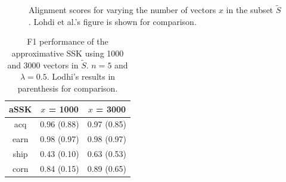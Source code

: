 \begin{figure}
	\centering
	\caption{Alignment scores for varying the number of vectors $ x $ in the subset $ \tilde{S} $. Lohdi et al.'s figure is shown for comparison.\label{fig:alignment}}
\end{figure}

\begin{table}
	\centering
	\begin{tabular}{| c | c | c | }\hline
		aSSK & $ x $ = 1000 & $ x $ = 3000   \\ \hline
		acq & 0.96 (0.88)& 0.97 (0.85)\\ \hline
		earn & 0.98 (0.97) & 0.98  (0.97) \\ \hline
		ship & 0.43 (0.10) & 0.63  (0.53) \\ \hline
		corn & 0.84 (0.15) & 0.89 (0.65) \\ \hline
	\end{tabular} 
	\caption{F1 performance of the approximative SSK using 1000 and 3000 vectors in $ \tilde{S} $. $ n = 5 $ and $ \lambda = 0.5 $. Lodhi's results in parenthesis for comparison.\label{tab:alignment}}
\end{table}


